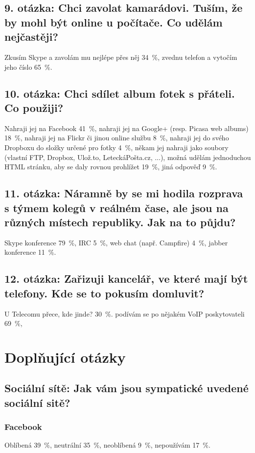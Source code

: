 \documentclass[12pt,oneside,final]{fithesis2}
\begin{document}
\subsection*{9. otázka: Chci zavolat kamarádovi. Tuším, že by mohl být online u počítače. Co udělám nejčastěji?}
Zkusím Skype a zavolám mu nejlépe přes něj 34~\%,
zvednu telefon a vytočím jeho číslo 65~\%.

\subsection*{10. otázka: Chci sdílet album fotek s přáteli. Co použiji?}
Nahraji jej na Facebook 41~\%,
nahraji jej na Google+ (resp. Picasa web albums) 18~\%,
nahraji jej na Flickr či jinou online službu 8~\%,
nahraji jej do svého Dropboxu do složky určené pro fotky 4~\%,
někam jej nahraji jako soubory (vlastní FTP, Dropbox, Ulož.to, LeteckáPošta.cz, ...), možná udělám jednoduchou HTML stránku, aby se daly rovnou prohlížet 19~\%,
jiná odpověď 9~\%.

\subsection*{11. otázka: Náramně by se mi hodila rozprava s týmem kolegů v reálném čase, ale jsou na různých místech republiky. Jak na to půjdu?}
Skype konference 79~\%,
IRC 5~\%,
web chat (např. Campfire) 4~\%,
jabber konference 11~\%.

\subsection*{12. otázka: Zařizuji kancelář, ve které mají být telefony. Kde se to pokusím domluvit?}
U Telecomu přece, kde jinde? 30~\%.
podívám se po nějakém VoIP poskytovateli 69~\%,


\section{Doplňující otázky}

\subsection*{Sociální sítě: Jak vám jsou sympatické uvedené sociální sitě?}
\subsubsection*{Facebook}
Oblíbená 39~\%,
neutrální 35~\%,
neoblíbená 9~\%,
nepoužívám 17~\%.
\end{document}

